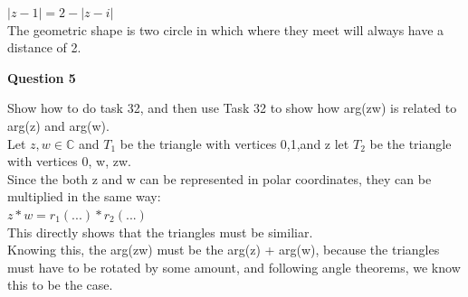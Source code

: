 \documentclass[12pt]{article}
\begin{document}
 $|z - 1| = 2 - |z - i|$ \\

The geometric shape is two circle in which where they meet will always have a distance of 2.\\


\begin{center}
\textbf{\large Question 5}
\end{center}

Show how to do task 32, and then use Task 32 to show how arg(zw) is related to arg(z) and arg(w).\\


Let $z, w \in \mathbb{C}$ and $T_1$ be the triangle with vertices 0,1,and z let $T_2$ be the triangle with vertices 0, w, zw.\\

Since the both z and w can be represented in polar coordinates, they can be multiplied in the same way:\\
$z * w = r_1(...)*r_2(...)$\\
This directly shows that the triangles must be similiar.\\

Knowing this, the arg(zw) must be the arg(z) + arg(w), because the triangles must have to be rotated by some amount, and following angle theorems, we know this to be the case. 
\end{document}
